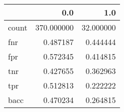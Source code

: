 \begin{tabular}{lrr}
\toprule
{} &         0.0 &        1.0 \\
\midrule
count &  370.000000 &  32.000000 \\
fnr   &    0.487187 &   0.444444 \\
fpr   &    0.572345 &   0.414815 \\
tnr   &    0.427655 &   0.362963 \\
tpr   &    0.512813 &   0.222222 \\
bacc  &    0.470234 &   0.264815 \\
\bottomrule
\end{tabular}
